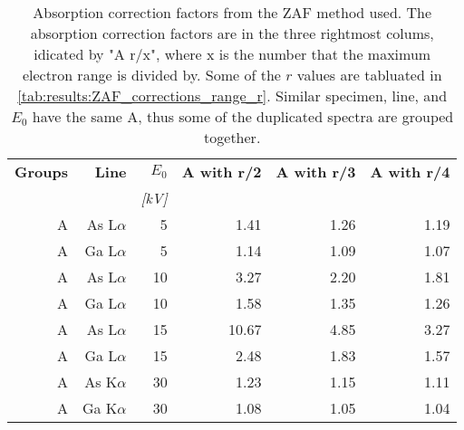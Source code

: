 \begin{table}[phtb]
    \begin{center}
        \caption{
            Absorption correction factors from the ZAF method used.
            The absorption correction factors are in the three rightmost colums, idicated by "A r/x", where x is the number that the maximum electron range is divided by.
            Some of the $r$ values are tabluated in \cref{tab:results:ZAF_corrections_range_r}.
            Similar specimen, line, and $E_0$ have the same A, thus some of the duplicated spectra are grouped together.
        }
        \label{tab:results:ZAF_corrections_factors}
        \begin{tabular}{rrrrrr}
            \hline
            \textbf{Groups} & \textbf{Line} & \textbf{$E_0$} & \textbf{A with r/2} & \textbf{A with r/3} & \textbf{A with r/4} \\
            \emph{}         & \emph{}       & \emph{[kV]}    & \emph{}             & \emph{}             & \emph{}             \\
            \hline
            A               & As L$\alpha$  & 5              & 1.41                & 1.26                & 1.19                \\
            A               & Ga L$\alpha$  & 5              & 1.14                & 1.09                & 1.07                \\
            A               & As L$\alpha$  & 10             & 3.27                & 2.20                & 1.81                \\
            A               & Ga L$\alpha$  & 10             & 1.58                & 1.35                & 1.26                \\
            A               & As L$\alpha$  & 15             & 10.67               & 4.85                & 3.27                \\
            A               & Ga L$\alpha$  & 15             & 2.48                & 1.83                & 1.57                \\
            A               & As K$\alpha$  & 30             & 1.23                & 1.15                & 1.11                \\
            A               & Ga K$\alpha$  & 30             & 1.08                & 1.05                & 1.04                \\

\end{tabular}
\end{center}
\end{table}
